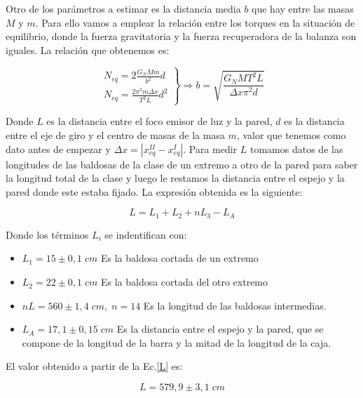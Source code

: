 \documentclass[a4paper,12pt,titlepage]{article}
\begin{document}
\par Otro de los parámetros a estimar es la distancia media $b$ que hay entre las masas $M$ y $m$. Para ello vamos a emplear la relación entre los torques en la situación de equilibrio, donde la fuerza gravitatoria y la fuerza recuperadora de la balanza son iguales. La relación que obtenemos es:

\begin{equation}
    \left. \begin{array}{l}
        N_{eq}= 2\frac{G_NMm}{b^2}d\\
        N_{eq} = \frac{2\pi^2m\Delta x}{T^2L}d^2
    \end{array} \right\} \Rightarrow b = \sqrt{\frac{G_NMT^2L}{\Delta x\pi^2d}}
    \label{b}
\end{equation}


Donde $L$ es la distancia entre el foco emisor de luz y la pared, $d$ es la distancia entre el eje de giro y el centro de masas de la masa $m$, valor que tenemos como dato antes de empezar y $\Delta x=|x_{eq}^{II}-x_{eq}^{I}|$. Para medir $L$ tomamos datos de las longitudes de las baldosas de la clase de un extremo a otro de la pared para saber la longitud total de la clase y luego le restamos la distancia entre el espejo y la pared donde este estaba fijado. La expresión obtenida es la siguiente:

\begin{equation}
    L = L_1+L_2+nL_3-L_A
    \label{L}
\end{equation}

\newpage

Donde los términos $L_i$ se indentifican con:

\begin{itemize}
    \item $L_1=15 \pm 0,1 \;cm$ Es la baldosa cortada de un extremo
    \item $L_2=22\pm 0,1 \;cm$ Es la baldosa cortada del otro extremo
    \item $nL=560\pm 1,4 \;cm, \;n=14$ Es la longitud de las baldosas intermedias.
    \item $L_A=17,1\pm 0,15 \;cm$ Es la distancia entre el espejo y la pared, que se compone de la longitud de la barra y la mitad de la longitud de la caja. 
\end{itemize}

El valor obtenido a partir de la Ec.\ref{L} es:

\begin{equation}
    L=579,9 \pm 3,1 \;cm
\end{equation}
\end{document}
